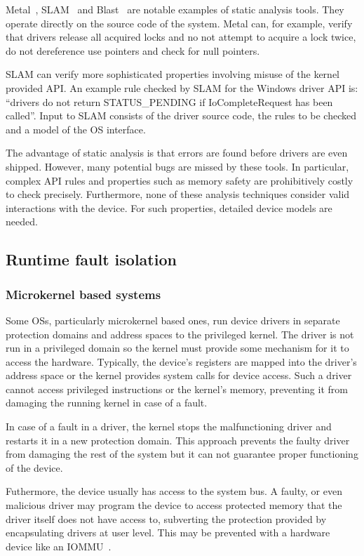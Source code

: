 Metal~\cite{Engler_CCH_00}, SLAM~\cite{Ball_CLR_04} and Blast~\cite{Beyer_HJM_07} are notable examples of static analysis tools. They operate directly on the source code of the system. Metal can, for example, verify that drivers release all acquired locks and no not attempt to acquire a lock twice, do not dereference use pointers and check for null pointers. 

SLAM can verify more sophisticated properties involving misuse of the kernel provided API. An example rule checked by SLAM for the Windows driver API is: ``drivers do not return STATUS\_PENDING if IoCompleteRequest has been called''. Input to SLAM consists of the driver source code, the rules to be checked and a model of the OS interface.

The advantage of static analysis is that errors are found before drivers are even shipped. However, many potential bugs are missed by these tools. In particular, complex API rules and properties such as memory safety are prohibitively costly to check precisely.  Furthermore, none of these analysis techniques consider valid interactions with the device. For such properties, detailed device models are needed. 

\subsection{Runtime fault isolation}
\subsubsection{Microkernel based systems}

Some OSs, particularly microkernel based ones, run device drivers in separate protection domains and address spaces to the privileged kernel. The driver is not run in a privileged domain so the kernel must provide some mechanism for it to access the hardware. Typically, the device's registers are mapped into the driver's address space or the kernel provides system calls for device access. Such a driver cannot access privileged instructions or the kernel's memory, preventing it from damaging the running kernel in case of a fault. 

In case of a fault in a driver, the kernel stops the malfunctioning driver and restarts it in a new protection domain. This approach prevents the faulty driver from damaging the rest of the system but it can not guarantee proper functioning of the device. 

Futhermore, the device usually has access to the system bus. A faulty, or even malicious driver may program the device to access protected memory that the driver itself does not have access to, subverting the protection provided by encapsulating drivers at user level. This may be prevented with a hardware device like an IOMMU~\cite{BenYehuda_MKXVMN_06}.

